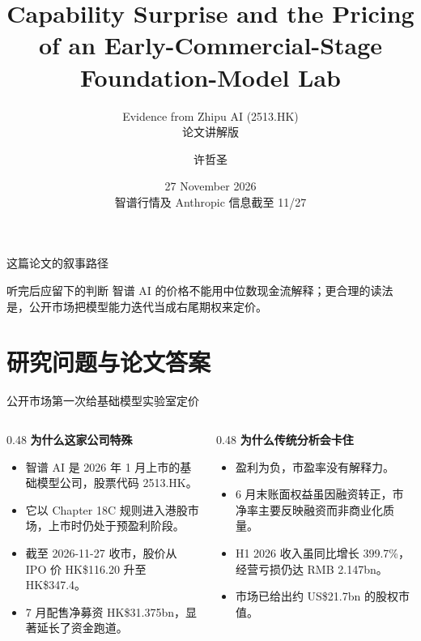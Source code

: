 \documentclass[aspectratio=169,11pt]{beamer}
\title[Zhipu AI Valuation]{Capability Surprise and the Pricing of an Early-Commercial-Stage Foundation-Model Lab}
\subtitle{Evidence from Zhipu AI (2513.HK)\\论文讲解版}
\author{许哲圣 \quad 42353012}
\institute{公司金融课程论文}
\date[27 November 2026]{27 November 2026\\{\small 智谱行情及 Anthropic 信息截至 11/27}}
\newcommand{\smallnote}[1]{\vspace{0.2em}{\footnotesize #1}}
\begin{document}
\begin{frame}
  \titlepage
\end{frame}

\begin{frame}{这篇论文的叙事路径}
  \tableofcontents
  \vspace{0.6em}
  \begin{block}{听完后应留下的判断}
    智谱 AI 的价格不能用中位数现金流解释；更合理的读法是，公开市场把模型能力迭代当成右尾期权来定价。
  \end{block}
\end{frame}

\section{研究问题与论文答案}

\begin{frame}{公开市场第一次给基础模型实验室定价}
  \begin{columns}[T,onlytextwidth]
    \begin{column}{0.48\textwidth}
      \textbf{为什么这家公司特殊}
      \begin{itemize}
        \item 智谱 AI 是 2026 年 1 月上市的基础模型公司，股票代码 2513.HK。
        \item 它以 Chapter 18C 规则进入港股市场，上市时仍处于预盈利阶段。
        \item 截至 2026-11-27 收市，股价从 IPO 价 HK\$116.20 升至 HK\$347.4。
        \item 7 月配售净募资 HK\$31.375bn，显著延长了资金跑道。
      \end{itemize}
    \end{column}
    \begin{column}{0.48\textwidth}
      \textbf{为什么传统分析会卡住}
      \begin{itemize}
        \item 盈利为负，市盈率没有解释力。
        \item 6 月末账面权益虽因融资转正，市净率主要反映融资而非商业化质量。
        \item H1 2026 收入虽同比增长 399.7\%，经营亏损仍达 RMB 2.147bn。
        \item 市场已给出约 US\$21.7bn 的股权市值。
      \end{itemize}
    \end{column}
  \end{columns}
  \smallnote{因此论文不是简单问“贵不贵”，而是问市场到底在为什么东西付钱。}
\end{frame}
\end{document}
